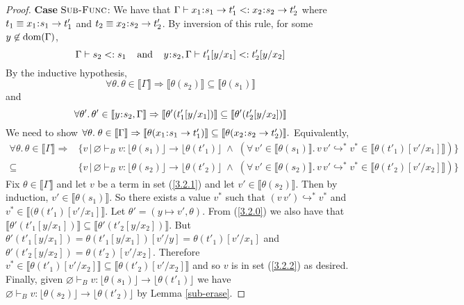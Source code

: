 \documentclass[11pt]{article}
\newcommand{\bind}{\hspace{0.05em}{:}\hspace{0.05em}} %
\newcommand{\lb}{\llbracket}         %
\newcommand{\rb}{\rrbracket}         %
\newcommand{\many}{\hookrightarrow^*}
\newcommand{\dom}[1]{{\rm dom}(#1)}
\begin{document}
\begin{proof}
{\bf Case} $\textsc{Sub-Func}$: We have that
$\Gamma \vdash x_1\bind s_1 \rightarrow t'_1 <: x_2\bind s_2 \rightarrow t'_2$ where $t_1 \equiv x_1\bind s_1 \rightarrow t'_1$ and $t_2 \equiv x_2\bind s_2 \rightarrow t'_2$. By inversion of this rule, for some $y\not\in\dom{\Gamma}$,
\[
\Gamma \vdash s_2 <: s_1 \;\;\;\;{\rm and}\;\;\;\;
y\bind s_2, \Gamma \vdash t'_1[y/x_1] <: t'_2[y/x_2]
\]
By the inductive hypothesis,
\[
\forall\theta.\, \theta \in \lb\Gamma\rb \Rightarrow
\lb\theta(s_2)\rb \subseteq\lb\theta(s_1)\rb 
\]
and
\begin{equation}\label{3.2.0}
\forall\theta'.\, \theta' \in \lb y\bind s_2,\Gamma\rb \Rightarrow
\lb\theta'(t'_1[y/x_1])\rb \subseteq\lb\theta'(t'_2[y/x_2])\rb 
\end{equation}
We need to show $\forall \theta.\; 
\theta \in \lb \Gamma \rb \Rightarrow 
\lb\theta(x_1\bind s_1\rightarrow t'_1)\rb \subseteq \lb\theta(x_2\bind s_2\rightarrow t'_2)\rb.$
Equivalently,
\begin{align} \label{3.2.1}
\forall\theta.\,\theta\in\lb\Gamma\rb \Rightarrow&
\{ v \,|\, \varnothing \vdash_B v:\lfloor \theta(s_1)\rfloor \rightarrow \lfloor \theta(t'_1)\rfloor \;\wedge\; 
  (\forall\, v' \in \lb \theta(s_1)\rb.\, v\,v' \many v^* \in\lb \theta(t'_1)[v'/x_1]\rb)\}\\
\subseteq &\{ v \,|\, \varnothing \vdash_B v:\lfloor \theta(s_2)\rfloor \rightarrow \lfloor \theta(t'_2)\rfloor \;\wedge\; 
  (\forall\, v' \in \lb \theta(s_2)\rb.\, v\,v' \many v^* \in\lb \theta(t'_2)[v'/x_2]\rb)\}\label{3.2.2} 
\end{align}
Fix $\theta \in \lb\Gamma\rb$ and let $v$ be a term in set (\ref{3.2.1}) and let $v' \in \lb \theta(s_2)\rb$. Then by induction, $v' \in \lb \theta(s_1)\rb$. So there exists a value $v^*$ such that $(v\, v') \many v^*$ and $v^* \in \lb(\theta(t'_1)[v'/x_1]\rb$. Let $\theta' = (y \mapsto v', \theta)$.  From (\ref{3.2.0}) we also have that 
$\lb\theta'(t'_1[y/x_1])\rb \subseteq \lb\theta'(t'_2[y/x_2])\rb$.
But $\theta'(t'_1[y/x_1]) = \theta(t'_1[y/x_1])[v'/y] = \theta(t'_1)[v'/x_1]$ and $\theta'(t'_2[y/x_2]) = \theta(t'_2)[v'/x_2]$.
Therefore  $v^* \in \lb \theta(t'_1)[v'/x_2]\rb \subseteq \lb \theta(t'_2)[v'/x_2]\rb$ and so $v$ is in set (\ref{3.2.2}) as desired.
Finally, given $\varnothing \vdash_B v:\lfloor \theta(s_1)\rfloor \rightarrow \lfloor \theta(t'_1)\rfloor$ we have $\varnothing \vdash_B v:\lfloor \theta(s_2)\rfloor \rightarrow \lfloor \theta(t'_2)\rfloor$ by Lemma \ref{sub-erase}.


\end{proof}
\end{document}
